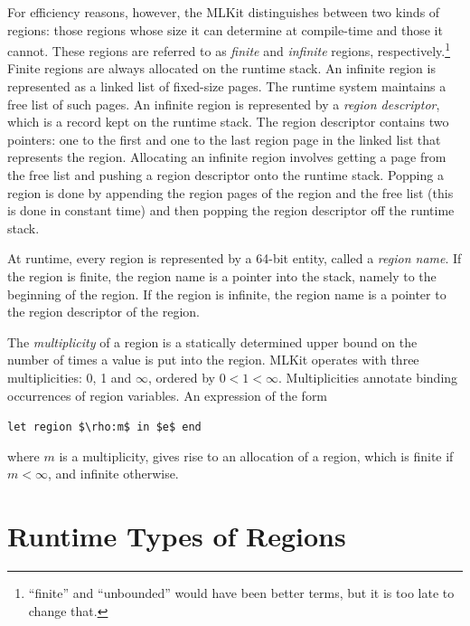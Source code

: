 \documentclass[12pt]{book}
\begin{document}
For efficiency reasons, however, the MLKit distinguishes between two kinds of
regions: those regions whose size it can determine at compile-time and those it
cannot.
%
%
These regions are referred to as
%
%
{\em finite} and
%
%
{\em infinite} regions, respectively.\footnote{``finite'' and ``unbounded''
would have been better terms, but it is too late to change that.}  Finite
regions are always allocated on the
%
%
runtime stack.  An infinite region is represented as a linked list of fixed-size
%
%
pages.  The runtime system maintains a free list of such pages. An infinite
region is represented by a
%
%
{\em region descriptor}, which is a record kept on the runtime stack.  The
region descriptor contains two pointers: one to the first and one to the last
region page in the linked list that represents the region.  Allocating an
infinite region involves getting a page from the
%
%
free list and pushing a region descriptor onto the runtime stack. Popping a
region is done by appending the region pages of the region and the free list
(this is done in constant time) and then popping the region descriptor off the
runtime stack.

At runtime, every region is represented by a 64-bit entity, called a
%
%
{\em region name}. If the region is finite, the region name is a pointer into
the stack, namely to the beginning of the region. If the region is infinite, the
region name is a pointer to the region descriptor of the region.

The
%
%
{\em multiplicity} of a region is a statically determined upper bound on the
number of times a value is put into the region. MLKit operates with three
multiplicities: 0, 1 and $\infty$, ordered by $0<1<\infty$. Multiplicities
annotate binding occurrences of region variables. An expression of the form
\begin{center}
  \lstinline!let region $\rho:m$ in $e$ end!
\end{center}
where $m$ is a multiplicity, gives rise to an allocation of a region, which is
finite if $m<\infty$, and infinite otherwise.

\section{Runtime Types of Regions}
\label{runtimetypes.sec}
\end{document}
